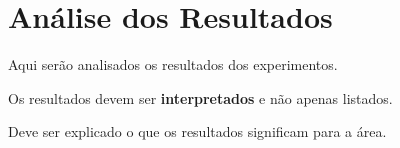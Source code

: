 \section{Análise dos Resultados}

Aqui serão analisados os resultados dos experimentos.

Os resultados devem ser \textbf{interpretados} e não apenas listados. 

Deve ser explicado o que os resultados significam para a área.
